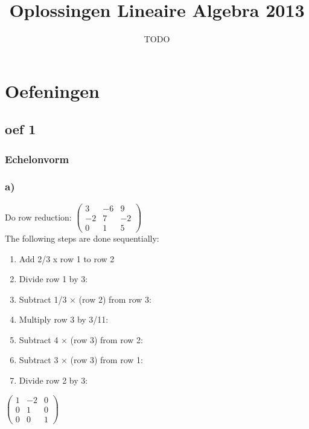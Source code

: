 \documentclass[10pt,a4paper]{article}
\title{Oplossingen Lineaire Algebra 2013}
\author{TODO}
\begin{document}
\maketitle
\pagebreak
\tableofcontents
\pagebreak


\section{Oefeningen}
\subsection*{oef 1}
\subsubsection*{Echelonvorm}
\subsubsection*{a)}
Do row reduction:
$\begin{pmatrix}
3 & -6 & 9\\
-2 & 7 & -2\\
0 & 1 & 5
\end{pmatrix}
$
\\
The following steps are done sequentially:

\begin{enumerate}
\item Add 2/3 x row 1 to row 2
\item Divide row 1 by 3:
\item Subtract 1/3 × (row 2) from row 3:
\item Multiply row 3 by 3/11:
\item Subtract 4 × (row 3) from row 2:
\item Subtract 3 × (row 3) from row 1:
\item Divide row 2 by 3:
\end{enumerate}

$
\begin{pmatrix}
1 & -2 & 0\\
0 & 1 & 0\\
0 & 0 & 1
\end{pmatrix}
$
\end{document}
